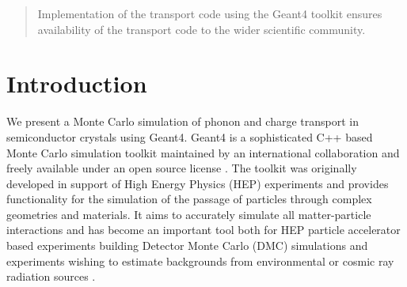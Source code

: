 \documentclass[final,3p,times,twocolumn]{elsarticle}
\begin{document}
\begin{frontmatter}
\begin{abstract}
Implementation of the transport code using the Geant4 toolkit ensures availability of the transport code to the wider scientific community.

\end{abstract}

\begin{keyword}


\end{keyword}

\end{frontmatter}





\section{Introduction}
\label{sec:Introduction}

We present a Monte Carlo simulation of phonon and charge transport in semiconductor crystals using Geant4. Geant4 is a sophisticated C++ based Monte Carlo simulation toolkit maintained by an international collaboration and freely available under an open source license \cite{Geant-A} \cite{Geant-B}. The toolkit was originally developed in support of High Energy Physics (HEP) experiments and provides functionality for the simulation of the passage of particles through complex geometries and materials. It aims to accurately simulate all matter-particle interactions and has become an important tool both for HEP particle accelerator based experiments building Detector Monte Carlo (DMC) simulations and experiments wishing to estimate backgrounds from environmental or cosmic ray radiation sources \cite{CDMS-D}\cite{Brandt}.
\end{document}

